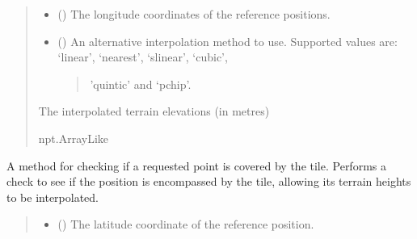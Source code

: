 \documentclass[letterpaper,10pt,english]{sphinxmanual}
\begin{document}
\begin{fulllineitems}
\begin{fulllineitems}
\begin{quote}
\begin{description}
\begin{itemize}
\item {} 
\sphinxAtStartPar
{} () \textendash{} The longitude coordinates of the reference positions.

\item {} 
\sphinxAtStartPar
{} () \textendash{} 
\sphinxAtStartPar
An alternative interpolation method to use. Supported
values are: ‘linear’, ‘nearest’, ‘slinear’, ‘cubic’,
\begin{quote}

\sphinxAtStartPar
’quintic’ and ‘pchip’.
\end{quote}


\end{itemize}

\sphinxAtStartPar
The interpolated terrain elevations (in metres)

\sphinxAtStartPar
npt.ArrayLike

\end{description}\end{quote}

\end{fulllineitems}


\begin{fulllineitems}
\label{\detokenize{modules/earth/dted:qnav.earth.dted.DtedTile.is_position_covered}}
\pysigstartsignatures
{}
\pysigstopsignatures
\sphinxAtStartPar
A method for checking if a requested point is covered by the tile.
Performs a check to see if the position is encompassed by the tile,
allowing its terrain heights to be interpolated.
\begin{quote}\begin{description}
\begin{itemize}
\item {} 
\sphinxAtStartPar
{} () \textendash{} The latitude coordinate of the reference position.


\end{itemize}
\end{description}
\end{quote}
\end{fulllineitems}
\end{fulllineitems}
\end{document}

